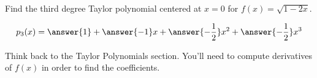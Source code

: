 \documentclass{ximera}
\author{Jim Talamo}
\begin{document}
\begin{exercise}
Find the third degree Taylor polynomial centered at $x=0$ for $f(x)=\sqrt{1-2x}$.

\[
p_3(x) = \answer{1}+{\answer{-1}}x+\answer{-\frac{1}{2}}x^2+\answer{-\frac{1}{2}}x^3
\]

\begin{hint}
Think back to the Taylor Polynomials section.  You'll need to compute derivatives of $f(x)$ in order to find the coefficients.
\end{hint}
 

\end{exercise}
\end{document}
